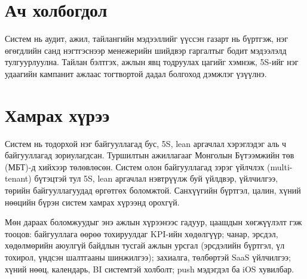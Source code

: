 \section*{Ач холбогдол}
Систем нь аудит, ажил, тайлангийн мэдээллийг үүссэн газарт нь бүртгэж, нэг өгөгдлийн санд нэгтгэснээр менежерийн шийдвэр гаргалтыг бодит мэдээлэлд тулгуурлуулна. Тайлан бэлтгэх, ажлын явц тодруулах цагийг хэмнэж, 5S-ийг нэг удаагийн кампанит ажлаас тогтвортой дадал болгоход дэмжлэг үзүүлнэ.

\section*{Хамрах хүрээ}
Систем нь тодорхой нэг байгууллагад бус, 5S, lean аргачлал хэрэглэдэг аль ч байгууллагад зориулагдсан. Туршилтын ажиллагааг Монголын Бүтээмжийн төв (МБТ)-д хийхээр төлөвлөсөн. Систем олон байгууллагад зэрэг үйлчлэх (multi-tenant) бүтэцтэй тул 5S, lean аргачлал нэвтрүүлж буй үйлдвэр, үйлчилгээ, төрийн байгууллагуудад өргөтгөх боломжтой. Санхүүгийн бүртгэл, цалин, хүний нөөцийн бүрэн систем хамрах хүрээнд орохгүй.

Мөн дараах боломжуудыг энэ ажлын хүрээнээс гадуур, цаашдын хөгжүүлэлт гэж тооцов: байгууллага өөрөө тохируулдаг KPI-ийн хөдөлгүүр; чанар, эрсдэл, хөдөлмөрийн аюулгүй байдлын тусгай ажлын урсгал (эрсдэлийн бүртгэл, үл тохирол, үндсэн шалтгааны шинжилгээ); захиалга, төлбөртэй SaaS үйлчилгээ; хүний нөөц, календарь, BI системтэй холболт; push мэдэгдэл ба iOS хувилбар.
